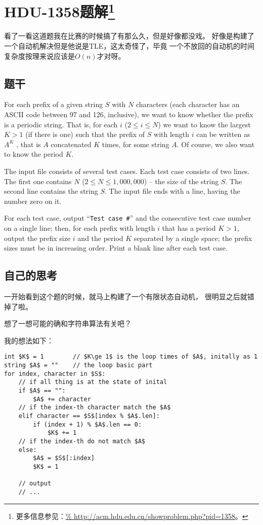 

\section[HDU-1358题解]{HDU-1358题解\footnote{更多信息参见：\url{%
http://acm.hdu.edu.cn/showproblem.php?pid=1358}。}}

看了一看这道题我在比赛的时候搞了有那么久，但是好像都没戏。
好像是构建了一个自动机解决但是他说是TLE，这太奇怪了，毕竟
一个不放回的自动机的时间复杂度按理来说应该是$O(n)$才对呀。

\subsection{题干}

For each prefix of a given string $S$ with $N$ characters
(each character has an ASCII code between 97 and 126,
inclusive), we want to know whether the prefix is a periodic
string. That is, for each $i$ ($2 \le i \le N$) we want to
know the largest $K > 1$ (if there is one) such that the
prefix of $S$ with length $i$ can be written as $A^K$ ,
that is $A$ concatenated $K$ times, for some string $A$.
Of course, we also want to know the period $K$.

The input file consists of several test cases. Each test
case consists of two lines. The first one contains $N$
($2 \le N \le 1,000,000$) – the size of the string $S$.
The second line contains the string $S$. The input file
ends with a line, having the number zero on it.

For each test case, output “\verb|Test case #|” and the
consecutive test case number on a single line; then, for
each prefix with length $i$ that has a period $K > 1$,
output the prefix size $i$ and the period $K$ separated by
a single space; the prefix sizes must be in increasing
order. Print a blank line after each test case.

\subsection{自己的思考}

一开始看到这个题的时候，就马上构建了一个有限状态自动机，
很明显之后就错掉了啦。

想了一想可能的确和字符串算法有关吧？

我的想法如下：
\begin{lstlisting}
int $K$ = 1        // $K\ge 1$ is the loop times of $A$, initally as 1
string $A$ = ""    // the loop basic part
for index, character in $S$:
    // if all thing is at the state of inital
    if $A$ == "":
        $A$ += character
    // if the index-th character match the $A$
    elif character == $S$[index % $A$.len]:
        if (index + 1) % $A$.len == 0:
            $K$ += 1
    // if the index-th do not match $A$
    else:
        $A$ = $S$[:index]
        $K$ = 1

    // output
    // ...
\end{lstlisting}


